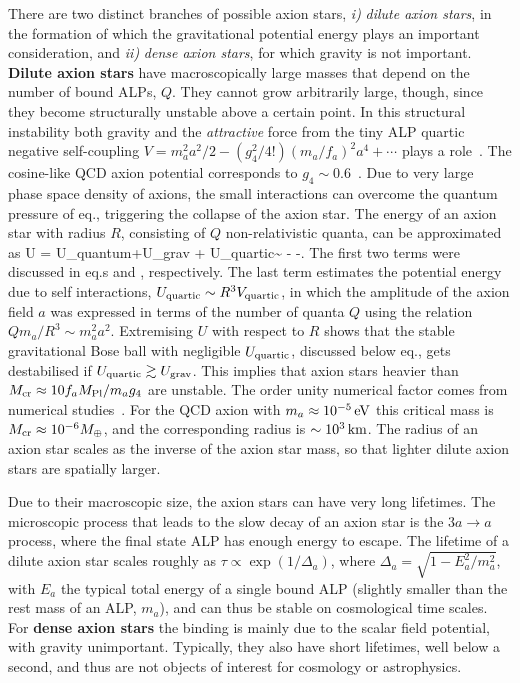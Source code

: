 \smallskip

There are two distinct branches of possible axion stars, {\em i)} {\em dilute axion stars}, in the formation of which the gravitational potential energy plays an important consideration, and {\em ii)} {\em dense axion stars}, for which gravity is not important. {\bf Dilute axion stars} have 
macroscopically large masses that depend on the number of bound ALPs, $Q$. They cannot grow arbitrarily large, though, since they become structurally unstable above a certain point. 
In this structural instability both gravity and the {\em attractive} force from the tiny ALP quartic negative self-coupling 
$V=m_a^2 a^2/2- (g_4^2/4!) (m_a/f_a)^2 a^4+\cdots$ plays a role~\cite{axion:stars}.
The cosine-like QCD axion potential corresponds to $g_4\sim 0.6$~\cite{axionmodels}. 
Due to very large phase space density of axions, the small interactions can overcome the quantum pressure of eq.,
triggering the collapse of the axion star. 
The energy of an axion star with radius $R$, consisting of $Q$ non-relativistic quanta, can be approximated as
\beq 
U = U_{\rm quantum}+U_{\rm grav} + U_{\rm quartic}\sim {} - -.
\eeq
The first two terms were discussed in eq.s and , respectively. 
The last term estimates the potential energy due to self interactions, $U_{\rm quartic} \sim R^3 V_{\rm quartic}$, in which the amplitude of the axion field $a$ was expressed in terms  
of the number of quanta $Q$ using the relation $Q m_a / R^3\sim m_a^2 a^2$.
Extremising $U$ with respect to $R$ shows that the stable gravitational Bose ball with negligible $U_{\rm quartic}$,
discussed below eq., gets destabilised if $U_{\rm quartic}\gtrsim U_{\rm grav}$. This 
implies that axion stars heavier than $ M_{\rm cr }\approx 10 f_a M_{\rm Pl}/m_a g_4$ are unstable.
The order unity numerical factor comes from numerical studies~\cite{axion:stars}.
For the QCD axion with $m_a \approx 10^{-5}\,{\rm eV}$ this critical mass is $M_{\rm cr }\approx 10^{-6}M_\oplus$, and the corresponding radius is $\sim 10^3\,{\rm km}$. 
The radius of an axion star scales as the inverse of the axion star mass, so that lighter dilute axion stars are spatially larger. 

Due to their macroscopic size, the axion stars can have very long lifetimes.  
The microscopic process that leads to the slow decay of an axion star is the $3a\to a$ process, where the final state ALP has enough energy to escape.  The lifetime of a dilute axion star scales roughly as $\tau\propto \exp(1/\Delta_a)$, where $\Delta_a =\sqrt{1-E_a^2/m_a^2}$, with $E_a$ the typical total energy of a single bound ALP (slightly smaller than the rest mass of an ALP, $m_a$), and can thus be stable on cosmological time scales. 
For {\bf dense axion stars} the binding is mainly due to the scalar field potential, with gravity unimportant. 
Typically, they also  have short lifetimes, well below a second, and thus are not objects of interest for cosmology or astrophysics. 


